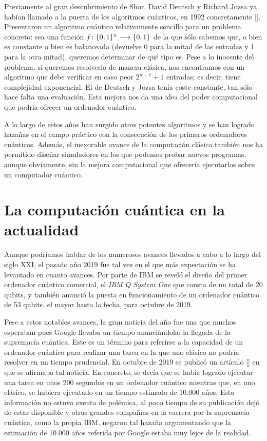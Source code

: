 Previamente al gran descubrimiento de Shor, David Deutsch y Richard Jozsa ya habían llamado a la puerta de los algoritmos cuánticos, en 1992 concretamente [\cite{deutsch1992rapid}]. Presentaron un algoritmo cuántico relativamente sencillo para un problema concreto: sea una función $f\colon \{0,1\}^n\longrightarrow \{0,1\}$ de la que sólo sabemos que, o bien es constante o bien es balanceada (devuelve 0 para la mitad de las entradas y 1 para la otra mitad), queremos determinar de qué tipo es. Pese a lo inocente del problema, si queremos resolverlo de manera clásica, nos encontramos con un algoritmo que debe verificar en caso peor $2^{n-1}+1$ entradas; es decir, tiene complejidad exponencial. El de Deutsch y Jozsa tenía coste constante, tan sólo hace falta una evaluación. Esta mejora nos da una idea del poder computacional que podría ofrecer un ordenador cuántico.

A lo largo de estos años han surgido otros potentes algoritmos y se han logrado hazañas en el campo práctico con la consecución de los primeros ordenadores cuánticos. Además, el inexorable avance de la computación clásica también nos ha permitido diseñar simuladores en los que podemos probar nuevos programas, aunque obviamente, sin la mejora computacional que ofrecería ejecutarlos sobre un computador cuántico.

\section{La computación cuántica en la actualidad}
Aunque podríamos hablar de los numerosos avances llevados a cabo a lo largo del siglo XXI, el pasado año 2019 fue tal vez en el que más expectación se ha levantado en cuanto avances. Por parte de IBM se reveló el diseño del primer ordenador cuántico comercial, el \textit{IBM Q System One} que consta de un total de 20 qubits, y también anunció la puesta en funcionamiento de un ordenador cuántico de 53 qubits, el mayor hasta la fecha, para octubre de 2019.

Pese a estos notables avances, la gran noticia del año fue una que muchos esperaban pues Google llevaba un tiempo anunciándola: la llegada de la supremacía cuántica. Este es un término para referirse a la capacidad de un ordenador cuántico para realizar una tarea en la que uno clásico no podría resolver en un tiempo prudencial. En octubre de 2019 se publicó un artículo [\cite{arute2019quantum}] en que se afirmaba tal noticia. En concreto, se decía que se había logrado ejecutar una tarea en unos 200 segundos en un ordenador cuántico mientras que, en uno clásico, se hubiera ejecutado en un tiempo estimado de 10.000 años. Esta información no estuvo exenta de polémica, al poco tiempo de su publicación dejó de estar disponible y otras grandes compañías en la carrera por la supremacía cuántica, como la propia IBM, negaron tal hazaña argumentando que la estimación de 10.000 años referida por Google estaba muy lejos de la realidad.

